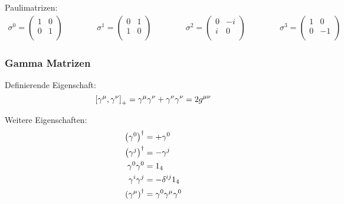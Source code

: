 \documentclass[11pt]{article}
\numberwithin{equation}{section}
\begin{document}
      Paulimatrizen:
      \begin{equation}
        \begin{aligned}
          \sigma^0 = \left(\begin{matrix}
            1 & 0 \\
            0 & 1 \\
          \end{matrix}\right) &&\hspace{30pt}
          \sigma^1 = \left(\begin{matrix}
            0 & 1 \\
            1 & 0 \\
          \end{matrix}\right) &&\hspace{30pt}
          \sigma^2 = \left(\begin{matrix}
            0 & -i \\
              i & 0 \\
          \end{matrix}\right) &&\hspace{30pt}
          \sigma^3 = \left(\begin{matrix}
            1 & 0 \\
            0 & -1 \\
          \end{matrix}\right)
        \end{aligned}
      \end{equation}

      \subsubsection{Gamma Matrizen}
        Definierende Eigenschaft:
        \begin{equation}
          \left[\gamma^\mu,\gamma^\nu\right]_{+} = \gamma^\mu \gamma^\nu + \gamma^\nu \gamma^\nu = 2g^{\mu\nu}
        \end{equation}

        Weitere Eigenschaften:
        \begin{equation}
          \begin{aligned}
            \Br{\gamma^0}^\dagger &= +\gamma^0 \\
            \Br{\gamma^j}^\dagger &= -\gamma^j \\
            \gamma^0 \gamma^0 &= 1_4 \\ %
            \gamma^i \gamma^j &= - \delta^{ij} 1_4 \\
            \Br{\gamma^\mu}^\dagger &= \gamma^0 \gamma^\mu \gamma^0 \\
          \end{aligned}
        \end{equation}
\end{document}
